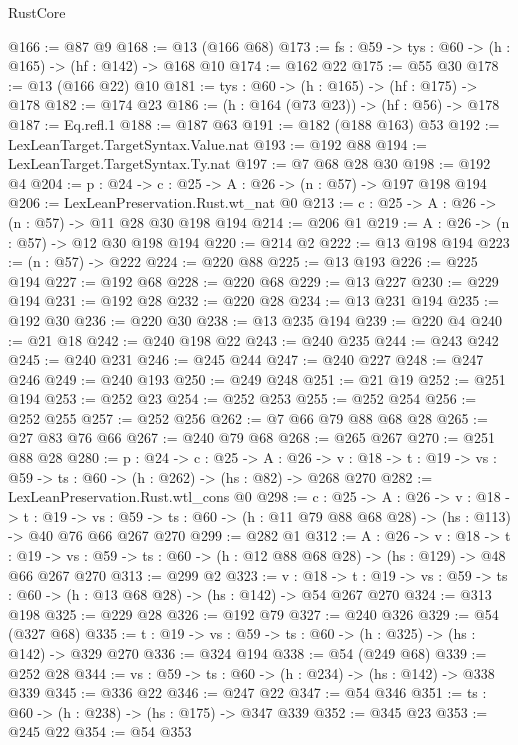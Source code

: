 \begin{lexlean}{RustCore}
\begin{coremodule}
@166 := @87 @9
@168 := @13 (@166 @68)
@173 := {fs : @59} -> {tys : @60} -> (h : @165) -> (hf : @142) -> @168 @10
@174 := @162 @22
@175 := @55 @30
@178 := @13 (@166 @22) @10
@181 := {tys : @60} -> (h : @165) -> (hf : @175) -> @178
@182 := @174 @23
@186 := (h : @164 (@73 @23)) -> (hf : @56) -> @178
@187 := Eq.refl.{1}
@188 := @187 @63
@191 := @182 (@188 @163) @53
@192 := LexLeanTarget.TargetSyntax.Value.nat
@193 := @192 @88
@194 := LexLeanTarget.TargetSyntax.Ty.nat
@197 := @7 @68 @28 @30
@198 := @192 @4
@204 := {p : @24} -> {c : @25} -> {A : @26} -> (n : @57) -> @197 @198 @194
@206 := LexLeanPreservation.Rust.wt_nat @0
@213 := {c : @25} -> {A : @26} -> (n : @57) -> @11 @28 @30 @198 @194
@214 := @206 @1
@219 := {A : @26} -> (n : @57) -> @12 @30 @198 @194
@220 := @214 @2
@222 := @13 @198 @194
@223 := (n : @57) -> @222
@224 := @220 @88
@225 := @13 @193
@226 := @225 @194
@227 := @192 @68
@228 := @220 @68
@229 := @13 @227
@230 := @229 @194
@231 := @192 @28
@232 := @220 @28
@234 := @13 @231 @194
@235 := @192 @30
@236 := @220 @30
@238 := @13 @235 @194
@239 := @220 @4
@240 := @21 @18
@242 := @240 @198 @22
@243 := @240 @235
@244 := @243 @242
@245 := @240 @231
@246 := @245 @244
@247 := @240 @227
@248 := @247 @246
@249 := @240 @193
@250 := @249 @248
@251 := @21 @19
@252 := @251 @194
@253 := @252 @23
@254 := @252 @253
@255 := @252 @254
@256 := @252 @255
@257 := @252 @256
@262 := @7 @66 @79 @88 @68 @28
@265 := @27 @83 @76 @66
@267 := @240 @79 @68
@268 := @265 @267
@270 := @251 @88 @28
@280 := {p : @24} ->
  {c : @25} ->
  {A : @26} ->
  {v : @18} -> {t : @19} -> {vs : @59} -> {ts : @60} -> (h : @262) -> (hs : @82) -> @268 @270
@282 := LexLeanPreservation.Rust.wtl_cons @0
@298 := {c : @25} ->
  {A : @26} ->
  {v : @18} ->
  {t : @19} ->
  {vs : @59} -> {ts : @60} -> (h : @11 @79 @88 @68 @28) -> (hs : @113) -> @40 @76 @66 @267 @270
@299 := @282 @1
@312 := {A : @26} ->
  {v : @18} ->
  {t : @19} -> {vs : @59} -> {ts : @60} -> (h : @12 @88 @68 @28) -> (hs : @129) -> @48 @66 @267 @270
@313 := @299 @2
@323 := {v : @18} ->
  {t : @19} -> {vs : @59} -> {ts : @60} -> (h : @13 @68 @28) -> (hs : @142) -> @54 @267 @270
@324 := @313 @198
@325 := @229 @28
@326 := @192 @79
@327 := @240 @326
@329 := @54 (@327 @68)
@335 := {t : @19} -> {vs : @59} -> {ts : @60} -> (h : @325) -> (hs : @142) -> @329 @270
@336 := @324 @194
@338 := @54 (@249 @68)
@339 := @252 @28
@344 := {vs : @59} -> {ts : @60} -> (h : @234) -> (hs : @142) -> @338 @339
@345 := @336 @22
@346 := @247 @22
@347 := @54 @346
@351 := {ts : @60} -> (h : @238) -> (hs : @175) -> @347 @339
@352 := @345 @23
@353 := @245 @22
@354 := @54 @353

\end{coremodule}
\end{lexlean}
